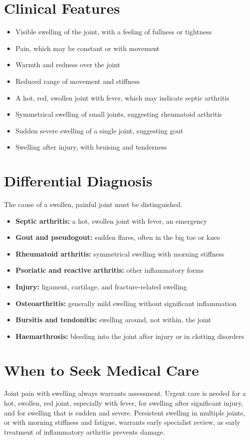 \section*{Clinical Features}
\begin{itemize}
    \item Visible swelling of the joint, with a feeling of fullness or tightness
    \item Pain, which may be constant or with movement
    \item Warmth and redness over the joint
    \item Reduced range of movement and stiffness
    \item A hot, red, swollen joint with fever, which may indicate septic arthritis
    \item Symmetrical swelling of small joints, suggesting rheumatoid arthritis
    \item Sudden severe swelling of a single joint, suggesting gout
    \item Swelling after injury, with bruising and tenderness
\end{itemize}

\section*{Differential Diagnosis}
The cause of a swollen, painful joint must be distinguished.
\begin{itemize}
    \item \textbf{Septic arthritis:} a hot, swollen joint with fever, an emergency
    \item \textbf{Gout and pseudogout:} sudden flares, often in the big toe or knee
    \item \textbf{Rheumatoid arthritis:} symmetrical swelling with morning stiffness
    \item \textbf{Psoriatic and reactive arthritis:} other inflammatory forms
    \item \textbf{Injury:} ligament, cartilage, and fracture-related swelling
    \item \textbf{Osteoarthritis:} generally mild swelling without significant inflammation
    \item \textbf{Bursitis and tendonitis:} swelling around, not within, the joint
    \item \textbf{Haemarthrosis:} bleeding into the joint after injury or in clotting disorders
\end{itemize}

\section*{When to Seek Medical Care}
Joint pain with swelling always warrants assessment. Urgent care is needed for a hot, swollen, red joint, especially with fever, for swelling after significant injury, and for swelling that is sudden and severe. Persistent swelling in multiple joints, or with morning stiffness and fatigue, warrants early specialist review, as early treatment of inflammatory arthritis prevents damage.

